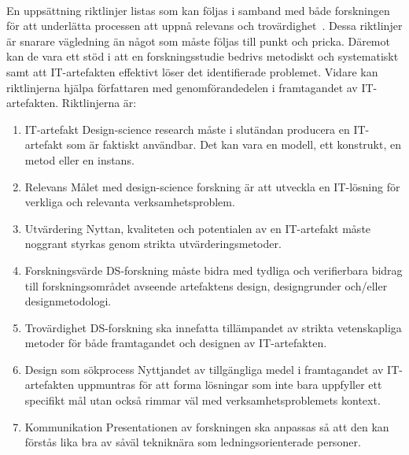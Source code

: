 \paragraph{}
\hspace{-11pt}En uppsättning riktlinjer listas som kan följas i samband med både forskningen för att underlätta processen att uppnå relevans och trovärdighet~\cite{Hevner2004}.
Dessa riktlinjer är snarare vägledning än något som måste följas till punkt och pricka.
Däremot kan de vara ett stöd i att en forskningsstudie bedrivs metodiskt och systematiskt samt att IT-artefakten effektivt löser det identifierade problemet.
Vidare kan riktlinjerna hjälpa författaren med genomförandedelen i framtagandet av IT-artefakten.
\newline
\newline
Riktlinjerna är:
\begin{enumerate}
    \item IT-artefakt \newline \newline
        Design-science research måste i slutändan producera en IT-artefakt som är faktiskt användbar.
        Det kan vara en modell, ett konstrukt, en metod eller en instans.
    \item Relevans \newline \newline
        Målet med design-science forskning är att utveckla en IT-lösning för verkliga och relevanta verksamhetsproblem.
    \item Utvärdering \newline \newline
        Nyttan, kvaliteten och potentialen av en IT-artefakt måste noggrant styrkas genom strikta utvärderingsmetoder.
    \item Forskningsvärde \newline \newline
        DS-forskning måste bidra med tydliga och verifierbara bidrag till forskningsområdet avseende artefaktens design, designgrunder och/eller designmetodologi.
    \item Trovärdighet \newline \newline
        DS-forskning ska innefatta tillämpandet av strikta vetenskapliga metoder för både framtagandet och designen av IT-artefakten.
    \item Design som sökprocess \newline \newline
        Nyttjandet av tillgängliga medel i framtagandet av IT-artefakten uppmuntras för att forma lösningar som inte bara uppfyller ett specifikt mål utan också rimmar väl med verksamhetsproblemets kontext.
    \item Kommunikation \newline \newline
        Presentationen av forskningen ska anpassas så att den kan förstås lika bra av såväl tekniknära som ledningsorienterade personer.
\end{enumerate}
